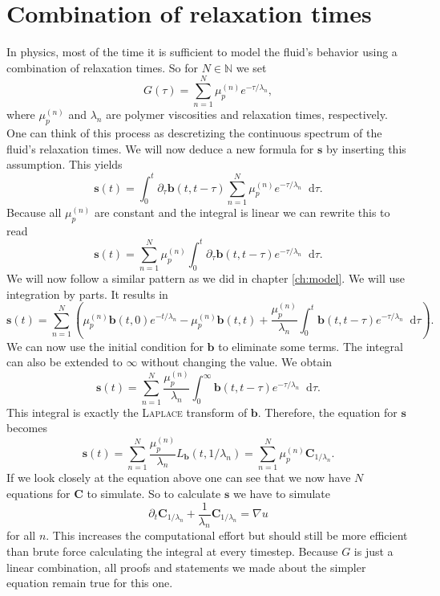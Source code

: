\documentclass[12pt,a4paper,twoside, open=right]{scrreprt}
\theoremstyle{definition}
\theoremstyle{plain}
\newcommand{\nn}{\mathbb{N}}
\newcommand{\bfb}{\bm{b}}
\newcommand{\bfs}{\bm{s}}
\newcommand{\bfC}{\bm{C}}
\newcommand{\D}{\mathop{}\!\mathrm{d}}
\begin{document}
\section{Combination of relaxation times}
In physics, most of the time it is sufficient to model the fluid's behavior using a combination of relaxation times. So for $N\in\nn$ we set
\begin{equation}
    G(\tau)=\sum_{n=1}^{N}\mu_p^{(n)}e^{-\tau/\lambda_n},
\end{equation}
where $\mu_p^{(n)}$ and $\lambda_n$ are polymer viscosities and relaxation times, respectively. One can think of this process as descretizing the continuous spectrum of the fluid's relaxation times. We will now deduce a new formula for $\bfs$ by inserting this assumption. This yields
\begin{equation}
    \bfs(t)=\int_0^t\partial_\tau \bfb(t,t-\tau)\sum_{n=1}^{N}\mu_p^{(n)}e^{-\tau/\lambda_n}\D\tau.
\end{equation}
Because all $\mu_p^{(n)}$ are constant and the integral is linear we can rewrite this to read
\begin{equation}
    \bfs(t) = \sum_{n=1}^{N}\mu_p^{(n)}\int_0^t\partial_\tau \bfb(t,t-\tau)e^{-\tau/\lambda_n}\D\tau.
\end{equation}
We will now follow a similar pattern as we did in chapter \ref{ch:model}. We will use integration by parts. It results in
\begin{equation}
    \bfs(t)=\sum_{n=1}^{N}\left(\mu_p^{(n)}\bfb(t,0)e^{-t/\lambda_n}-\mu_p^{(n)}\bfb(t,t)+\frac{\mu_p^{(n)}}{\lambda_n}\int_0^t\bfb(t,t-\tau)e^{-\tau/\lambda_n}\D\tau \right).
\end{equation}
We can now use the initial condition for $\bfb$ to eliminate some terms. The integral can also be extended to $\infty$ without changing the value. We obtain
\begin{equation}
    \bfs(t)=\sum_{n=1}^N\frac{\mu_p^{(n)}}{\lambda_n}\int_0^\infty\bfb(t,t-\tau)e^{-\tau/\lambda_n}\D\tau.
\end{equation}
This integral is exactly the \textsc{Laplace} transform of $\bfb$. Therefore, the equation for $\bfs$ becomes
\begin{equation}
    \bfs(t)=\sum_{n=1}^N\frac{\mu_p^{(n)}}{\lambda_n}L_{\bfb}(t,1/\lambda_n)=\sum_{n=1}^N\mu_p^{(n)}\bfC_{1/\lambda_n}.
\end{equation}
If we look closely at the equation above one can see that we now have $N$ equations for $\bfC$ to simulate. So to calculate $\bfs$ we have to simulate 
\begin{equation}
    \partial_t \bfC_{1/\lambda_n}+\frac{1}{\lambda_n}\bfC_{1/\lambda_n}=\nabla u
\end{equation}
for all $n$. This increases the computational effort but should still be more efficient than brute force calculating the integral at every timestep. Because $G$ is just a linear combination, all proofs and statements we made about the simpler equation remain true for this one.
\end{document}
